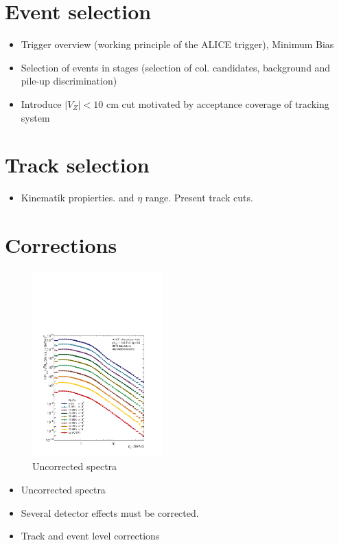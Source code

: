 \documentclass[12pt,a4paper]{report}
\begin{document}
\section{Event selection}
\begin{itemize}
\item Trigger overview (working principle of the ALICE trigger), Minimum Bias
\item Selection of events in stages (selection of col. candidates, background and pile-up discrimination)
\item Introduce $|V_Z| < 10$ cm cut motivated by acceptance coverage of tracking system
\end{itemize}
\section{Track selection}
\begin{itemize}
\item Kinematik propierties.  \pt and $\eta$ range. Present track cuts.
\end{itemize}
\section{Corrections}
\begin{figure}[tb!]
\centering
\includegraphics[width=0.45\textwidth]{Plots/uncorrectedSpectra.pdf} 
\caption{Uncorrected \pt spectra}
\end{figure}

\begin{itemize}
\item Uncorrected \pt spectra
\item Several detector effects must be corrected.
\item Track and event level corrections
\end{itemize}
\end{document}
